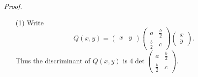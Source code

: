 \documentclass{article}
\begin{document}
\emph{Proof.}
\begin{enumerate}
\item[(1)]
  Write
  \[
    Q(x,y)
    =
    \begin{pmatrix}
      x & y
    \end{pmatrix}
    \begin{pmatrix}
      a & \frac{b}{2} \\
      \frac{b}{2} & c
    \end{pmatrix}
    \begin{pmatrix}
      x \\
      y
    \end{pmatrix}.
  \]
  Thus the discriminant of $Q(x,y)$ is
  $4 \det\begin{pmatrix}
    a & \frac{b}{2} \\
    \frac{b}{2} & c
  \end{pmatrix}$.


\end{enumerate}
\end{document}
